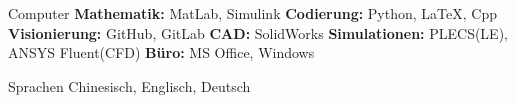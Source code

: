 

\begin{cvskills}

  \cvskill
    {Computer} %
    {\textbf{Mathematik:} MatLab, Simulink \textbf{Codierung:} Python, \LaTeX, Cpp \textbf{Visionierung: } GitHub, GitLab \textbf{CAD:} SolidWorks \textbf{Simulationen:} PLECS(LE), ANSYS Fluent(CFD) \textbf{Büro:} MS Office, Windows} %
    
  \cvskill
    {Sprachen} %
    {Chinesisch, Englisch, Deutsch} %
    
\end{cvskills}
